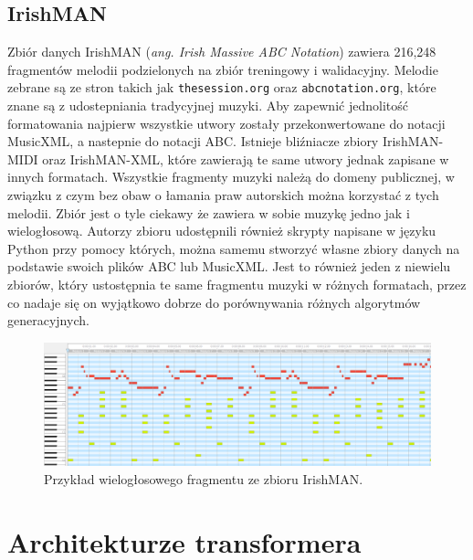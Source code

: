 \documentclass[data-science]{agh-wi} %
\begin{document}
\subsection{IrishMAN}
Zbiór danych IrishMAN (\textit{ang. Irish Massive ABC Notation}) \cite{irishman} zawiera 216,248 fragmentów melodii podzielonych na zbiór treningowy i walidacyjny. Melodie zebrane są ze stron takich jak \texttt{thesession.org} oraz \texttt{abcnotation.org}, które znane są z udostepniania tradycyjnej muzyki. Aby zapewnić jednolitość formatowania najpierw wszystkie utwory zostały przekonwertowane do notacji MusicXML, a nastepnie do notacji ABC. Istnieje bliźniacze zbiory IrishMAN-MIDI oraz IrishMAN-XML, które zawierają te same utwory jednak zapisane w innych formatach. Wszystkie fragmenty muzyki należą do domeny publicznej, w związku z czym bez obaw o łamania praw autorskich można korzystać z tych melodii. Zbiór jest o tyle ciekawy że zawiera w sobie muzykę jedno jak i wielogłosową. Autorzy zbioru udostępnili również skrypty napisane w języku Python przy pomocy których, można samemu stworzyć własne zbiory danych na podstawie swoich plików ABC lub MusicXML. Jest to również jeden z niewielu zbiorów, który ustostępnia te same fragmentu muzyki w różnych formatach, przez co nadaje się on wyjątkowo dobrze do porównywania różnych algorytmów generacyjnych.

\begin{figure}[ht!]
    \begin{center}
        \includegraphics[width=0.9\linewidth]{./img/irishman_midi.png}
    \end{center}
    \caption{Przykład wielogłosowego fragmentu ze zbioru IrishMAN.}\label{fig:irish_midi}
\end{figure}

\section{Architekturze transformera}
\end{document}
